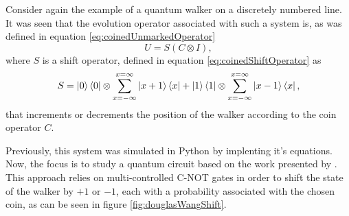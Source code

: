 \documentclass[../../dissertation.tex]{subfiles}
\begin{document}
Consider again the example of a quantum walker on a discretely numbered line. It was seen that the evolution operator associated with such a system is, as was defined in equation \ref{eq:coinedUnmarkedOperator}
\begin{equation}
	   U = S(C\otimes I), 
           \label{eq:coinedUnmarkedOperatorQiskit}
\end{equation}
where $S$ is a shift operator, defined in equation \ref{eq:coinedShiftOperator} as 
\begin{equation}
          S = \ket{0}\bra{0} \otimes \sum_{x=-\infty}^{x=\infty} \ket{x+1}\bra{x} + \ket{1}\bra{1}\otimes \sum_{x=-\infty}^{x=\infty} \ket{x-1}\bra{x},
\end{equation} 
that increments or decrements the position of the walker according to the coin operator $C$.\par
Previously, this system was simulated in Python by implenting it's equations. Now, the focus is to study a quantum circuit based on the work presented by \cite{douglaswang07}. This approach relies on multi-controlled C-NOT gates in order to shift the state of the walker by $+1$ or $-1$, each with a probability associated with the chosen coin, as can be seen in figure \ref{fig:douglasWangShift}. 
\end{document}
